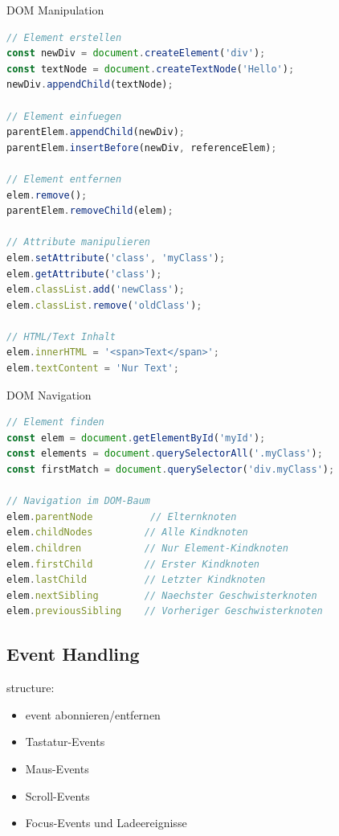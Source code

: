 \begin{KR}{DOM Manipulation}
\begin{lstlisting}[language=JavaScript, style=basesmol]
// Element erstellen
const newDiv = document.createElement('div');
const textNode = document.createTextNode('Hello');
newDiv.appendChild(textNode);

// Element einfuegen
parentElem.appendChild(newDiv);
parentElem.insertBefore(newDiv, referenceElem);

// Element entfernen
elem.remove();
parentElem.removeChild(elem);

// Attribute manipulieren
elem.setAttribute('class', 'myClass');
elem.getAttribute('class');
elem.classList.add('newClass');
elem.classList.remove('oldClass');

// HTML/Text Inhalt
elem.innerHTML = '<span>Text</span>';
elem.textContent = 'Nur Text';
\end{lstlisting}
\end{KR}

\begin{KR}{DOM Navigation}
\begin{lstlisting}[language=JavaScript, style=basesmol]
// Element finden
const elem = document.getElementById('myId');
const elements = document.querySelectorAll('.myClass');
const firstMatch = document.querySelector('div.myClass');

// Navigation im DOM-Baum
elem.parentNode          // Elternknoten
elem.childNodes         // Alle Kindknoten
elem.children           // Nur Element-Kindknoten
elem.firstChild         // Erster Kindknoten
elem.lastChild          // Letzter Kindknoten
elem.nextSibling        // Naechster Geschwisterknoten
elem.previousSibling    // Vorheriger Geschwisterknoten
\end{lstlisting}
\end{KR}



\pagebreak

\subsection{Event Handling}

structure:
\begin{itemize}
    \item event abonnieren/entfernen
    \item Tastatur-Events
    \item Maus-Events
    \item Scroll-Events
    \item Focus-Events und Ladeereignisse
\end{itemize}

